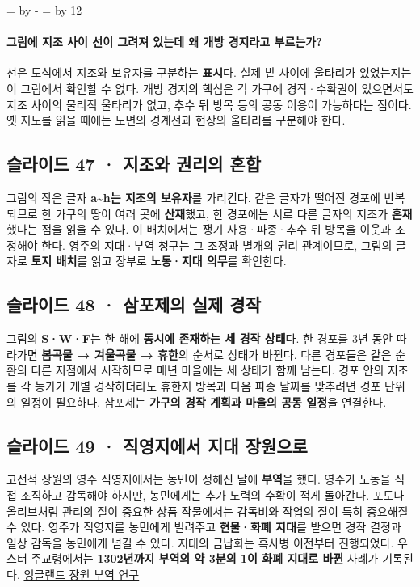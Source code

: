 \documentclass[10pt,a4paper]{article}
\newcommand{\ReserveQuestionSpace}{%
  \par\begingroup
  \dimen0=\pagegoal \advance\dimen0 by -\pagetotal
  \dimen2=\baselineskip \multiply\dimen2 by 12
  \ifdim\dimen0<\dimen2 \newpage\fi
  \endgroup}
\begin{document}
\ReserveQuestionSpace
\paragraph{그림에 지조 사이 선이 그려져 있는데 왜 개방 경지라고 부르는가?}
선은 도식에서 지조와 보유자를 구분하는 \textbf{표시}다. 실제 밭 사이에 울타리가 있었는지는 이 그림에서 확인할 수 없다. 개방 경지의 핵심은 각 가구에 경작·수확권이 있으면서도 지조 사이의 물리적 울타리가 없고, 추수 뒤 방목 등의 공동 이용이 가능하다는 점이다. 옛 지도를 읽을 때에는 도면의 경계선과 현장의 울타리를 구분해야 한다.\par

\subsection{슬라이드 47 · 지조와 권리의 혼합}
그림의 작은 글자 \textbf{a\textasciitilde{}h는 지조의 보유자}를 가리킨다. 같은 글자가 떨어진 경포에 반복되므로 한 가구의 땅이 여러 곳에 \textbf{산재}했고, 한 경포에는 서로 다른 글자의 지조가 \textbf{혼재}했다는 점을 읽을 수 있다. 이 배치에서는 쟁기 사용·파종·추수 뒤 방목을 이웃과 조정해야 한다. 영주의 지대·부역 청구는 그 조정과 별개의 권리 관계이므로, 그림의 글자로 \textbf{토지 배치}를 읽고 장부로 \textbf{노동·지대 의무}를 확인한다.\par

\subsection{슬라이드 48 · 삼포제의 실제 경작}
그림의 \textbf{S·W·F}는 한 해에 \textbf{동시에 존재하는 세 경작 상태}다. 한 경포를 3년 동안 따라가면 \textbf{봄곡물 → 겨울곡물 → 휴한}의 순서로 상태가 바뀐다. 다른 경포들은 같은 순환의 다른 지점에서 시작하므로 매년 마을에는 세 상태가 함께 남는다. 경포 안의 지조를 각 농가가 개별 경작하더라도 휴한지 방목과 다음 파종 날짜를 맞추려면 경포 단위의 일정이 필요하다. 삼포제는 \textbf{가구의 경작 계획과 마을의 공동 일정}을 연결한다.\par

\subsection{슬라이드 49 · 직영지에서 지대 장원으로}
고전적 장원의 영주 직영지에서는 농민이 정해진 날에 \textbf{부역}을 했다. 영주가 노동을 직접 조직하고 감독해야 하지만, 농민에게는 추가 노력의 수확이 적게 돌아간다. 포도나 올리브처럼 관리의 질이 중요한 상품 작물에서는 감독비와 작업의 질이 특히 중요해질 수 있다. 영주가 직영지를 농민에게 빌려주고 \textbf{현물·화폐 지대}를 받으면 경작 결정과 일상 감독을 농민에게 넘길 수 있다. 지대의 금납화는 흑사병 이전부터 진행되었다. 우스터 주교령에서는 \textbf{1302년까지 부역의 약 3분의 1이 화폐 지대로 바뀐} 사례가 기록된다. \href{https://www.cambridge.org/core/journals/journal-of-british-studies/article/sick-leave-of-customary-tenants-in-late-medieval-england/9B28EA48C8926957665D526DF414F50C}{잉글랜드 장원 부역 연구}\par
\end{document}
